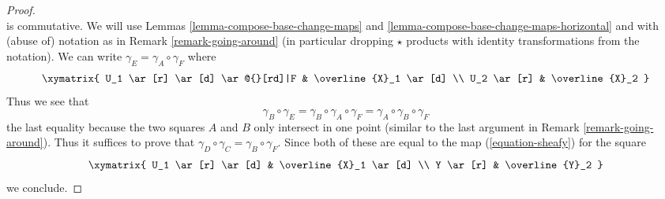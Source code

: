 \begin{proof}
$${}
$$
is commutative. We will use
Lemmas \ref{lemma-compose-base-change-maps} and
\ref{lemma-compose-base-change-maps-horizontal}
and with (abuse of) notation as in
Remark \ref{remark-going-around} (in particular
dropping $\star$ products with identity transformations
from the notation).
We can write $\gamma_E = \gamma_A \circ \gamma_F$ where
$$
\xymatrix{
U_1 \ar[r] \ar[d] \ar@{}[rd]|F & \overline{X}_1 \ar[d] \\
U_2 \ar[r] & \overline{X}_2
}
$$
Thus we see that
$$
\gamma_B \circ \gamma_E = \gamma_B \circ \gamma_A  \circ \gamma_F
= \gamma_A \circ \gamma_B \circ \gamma_F
$$
the last equality because the two squares $A$ and $B$ only
intersect in one point (similar to the last argument in
Remark \ref{remark-going-around}). Thus it suffices to prove that
$\gamma_D \circ \gamma_C = \gamma_B \circ \gamma_F$.
Since both of these are equal to the map (\ref{equation-sheafy})
for the square
$$
\xymatrix{
U_1 \ar[r] \ar[d] & \overline{X}_1 \ar[d] \\
Y \ar[r] & \overline{Y}_2
}
$$
we conclude.
\end{proof}